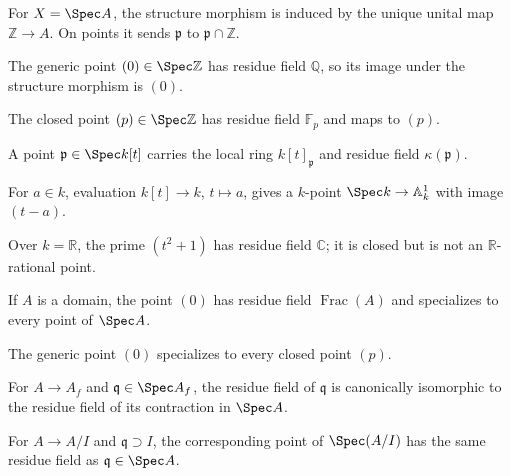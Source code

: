 \begin{example}\label{ex:vi21-e01}
For $X=\Spec A$, the structure morphism is induced by the unique unital map $\mathbb Z\to A$.  On points it sends $\mathfrak p$ to $\mathfrak p\cap\mathbb Z$.
\end{example}
\begin{example}\label{ex:vi21-e02}
The generic point $(0)\in\Spec\mathbb Z$ has residue field $\mathbb Q$, so its image under the structure morphism is $(0)$.
\end{example}
\begin{example}\label{ex:vi21-e03}
The closed point $(p)\in\Spec\mathbb Z$ has residue field $\mathbb F_p$ and maps to $(p)$.
\end{example}
\begin{example}\label{ex:vi21-e04}
A point $\mathfrak p\in\Spec k[t]$ carries the local ring $k[t]_{\mathfrak p}$ and residue field $\kappa(\mathfrak p)$.
\end{example}
\begin{example}\label{ex:vi21-e05}
For $a\in k$, evaluation $k[t]\to k$, $t\mapsto a$, gives a $k$-point $\Spec k\to\mathbb A^1_k$ with image $(t-a)$.
\end{example}
\begin{example}\label{ex:vi21-e06}
Over $k=\mathbb R$, the prime $(t^2+1)$ has residue field $\mathbb C$; it is closed but is not an $\mathbb R$-rational point.
\end{example}
\begin{example}\label{ex:vi21-e07}
If $A$ is a domain, the point $(0)$ has residue field $\operatorname{Frac}(A)$ and specializes to every point of $\Spec A$.
\end{example}
\begin{example}\label{ex:vi21-e08}
The generic point $(0)$ specializes to every closed point $(p)$.
\end{example}
\begin{example}\label{ex:vi21-e09}
For $A\to A_f$ and $\mathfrak q\in\Spec A_f$, the residue field of $\mathfrak q$ is canonically isomorphic to the residue field of its contraction in $\Spec A$.
\end{example}
\begin{example}\label{ex:vi21-e10}
For $A\to A/I$ and $\mathfrak q\supset I$, the corresponding point of $\Spec(A/I)$ has the same residue field as $\mathfrak q\in\Spec A$.
\end{example}
